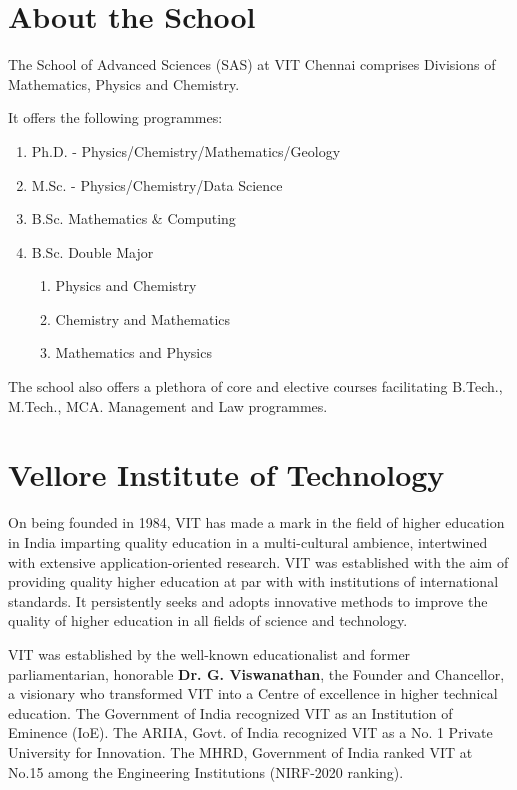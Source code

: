 \section{About the School}

The School of Advanced Sciences (SAS) at VIT Chennai comprises Divisions of Mathematics, Physics and Chemistry.

It offers the following programmes:
\begin{enumerate}[label={\color{primaryColor}\faCheckSquareO}]
	\item Ph.D. - Physics/Chemistry/Mathematics/Geology
	\item M.Sc. - Physics/Chemistry/Data Science
	\item B.Sc. Mathematics \& Computing
	\item B.Sc. Double Major
	\begin{enumerate}[label={\color{primaryColor}\faChevronRight}]
		\item Physics and Chemistry
		\item Chemistry and Mathematics 
		\item Mathematics and Physics  
	\end{enumerate}
\end{enumerate}


The school also offers a plethora of core and elective courses facilitating B.Tech., M.Tech., MCA. Management and Law programmes.

\section{Vellore Institute of Technology}
On being founded in 1984, VIT has made a mark in the field of higher education in India imparting quality education in a multi-cultural ambience, intertwined with extensive application-oriented research.
VIT was established with the aim of providing quality higher education at par with with institutions of international standards. It persistently seeks and adopts innovative methods to improve the quality of higher education in all fields of science and technology. 





VIT was established by the well-known educationalist and former parliamentarian, honorable \textbf{Dr. G. Viswanathan}, the Founder and Chancellor, a visionary who transformed VIT into a Centre of excellence in higher technical education. The Government of India recognized VIT as an Institution of Eminence (IoE). The ARIIA, Govt. of India recognized VIT as a No. 1 Private University for Innovation. The MHRD, Government of India ranked VIT at No.15 among the Engineering Institutions (NIRF-2020 ranking).
